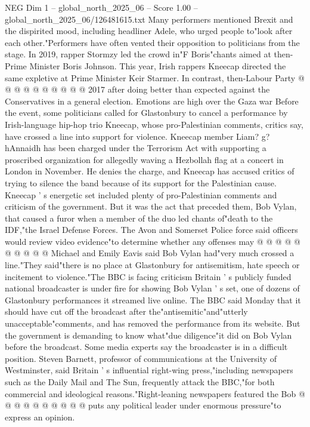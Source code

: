 \begin{textsample}{NEG Dim 1 – global\_north\_2025\_06 – Score 1.00 – global\_north\_2025\_06/126481615.txt}
Many performers mentioned Brexit and the dispirited mood, including headliner Adele, who urged people to"look after each other."Performers have often vented their opposition to politicians from the stage.
In 2019, rapper Stormzy led the crowd in"F Boris"chants aimed at then-Prime Minister Boris Johnson.
This year, Irish rappers Kneecap directed the same expletive at Prime Minister Keir Starmer.
In contrast, then-Labour Party @ @ @ @ @ @ @ @ @ @ 2017 after doing better than expected against the Conservatives in a general election.
Emotions are high over the Gaza war Before the event, some politicians called for Glastonbury to cancel a performance by Irish-language hip-hop trio Kneecap, whose pro-Palestinian comments, critics say, have crossed a line into support for violence.
Kneecap member Liam? g? hAnnaidh has been charged under the Terrorism Act with supporting a proscribed organization for allegedly waving a Hezbollah flag at a concert in London in November.
He denies the charge, and Kneecap has accused critics of trying to silence the band because of its support for the Palestinian cause.
Kneecap ' s energetic set included plenty of pro-Palestinian comments and criticism of the government.
But it was the act that preceded them, Bob Vylan, that caused a furor when a member of the duo led chants of"death to the IDF,"the Israel Defense Forces.
The Avon and Somerset Police force said officers would review video evidence"to determine whether any offenses may @ @ @ @ @ @ @ @ @ @ Michael and Emily Eavis said Bob Vylan had"very much crossed a line."They said"there is no place at Glastonbury for antisemitism, hate speech or incitement to violence."The BBC is facing criticism Britain ' s publicly funded national broadcaster is under fire for showing Bob Vylan ' s set, one of dozens of Glastonbury performances it streamed live online.
The BBC said Monday that it should have cut off the broadcast after the"antisemitic"and"utterly unacceptable"comments, and has removed the performance from its website.
But the government is demanding to know what"due diligence"it did on Bob Vylan before the broadcast.
Some media experts say the broadcaster is in a difficult position.
Steven Barnett, professor of communications at the University of Westminster, said Britain ' s influential right-wing press,"including newspapers such as the Daily Mail and The Sun, frequently attack the BBC,"for both commercial and ideological reasons."Right-leaning newspapers featured the Bob @ @ @ @ @ @ @ @ @ @ puts any political leader under enormous pressure"to express an opinion.

\end{textsample}
